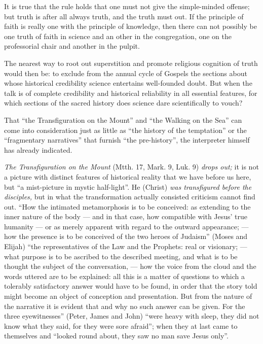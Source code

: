 \documentclass[12pt,a4paper,openany]{book}
\newcommand{\opage}[1]{\marginnote{\footnotesize\textit{[#1]}}}
\begin{document}
\setcounter{footnote}{0}%
\opage{300}It is true that the rule holds that one must not give
the simple-minded offense; but truth is after all always
truth, and the truth must out. If the principle of faith
is really one with the principle of knowledge, then there can
not possibly be one truth of faith in science and an
other in the congregation, one on the professorial chair and another in
the pulpit.

The nearest way to root out superstition and promote
religious cognition of truth would then be:
to exclude from the annual cycle of Gospels the sections
about whose historical credibility science entertains well-founded
doubt. But when the talk is of complete credibility
and historical reliability in all essential
features, for which sections of the sacred history does science dare
scientifically to vouch?

That ``the Transfiguration on the Mount'' and ``the Walking on
the Sea'' can come into consideration just as little as
``the history of the temptation'' or the ``fragmentary narratives''
that furnish ``the pre-history'', the interpreter himself
has already indicated.

\emph{The Transfiguration on the Mount} (Mtth. 17, Mark. 9,
Luk. 9) \emph{drops out;} it is not a picture with distinct
features of historical reality that we have before us here, but
``a mist-picture in mystic half-light''. He (Christ)
\emph{was transfigured before the disciples,} but in what the transformation
actually consisted criticism cannot find out.
``How the intimated metamorphosis is to be conceived:
as extending to the inner nature of the body --- and in
that case, how compatible with Jesus' true humanity
--- or as merely apparent with regard
to the outward appearance; --- how the presence
\setcounter{footnote}{0}%
\opage{301}is to be conceived of the two heroes of Judaism''
(Moses and Elijah) ``the representatives of the Law and the Prophets:
real or visionary; --- what purpose is
to be ascribed to the described meeting, and what is
to be thought the subject of the conversation, --- how
the voice from the cloud and the words uttered are to be explained: all
this is a matter of questions to which a tolerably satisfactory
answer would have to be found, in order that the story told
might become an object of conception
and presentation. But from the nature of the narrative
it is evident that and why no such answer
can be given. For the three eyewitnesses'' (Peter, James
and John) ``were heavy with sleep, they did not know
what they said, for they were sore afraid''; when they
at last came to themselves and ``looked round about, they saw no man
save Jesus only''.
\end{document}
